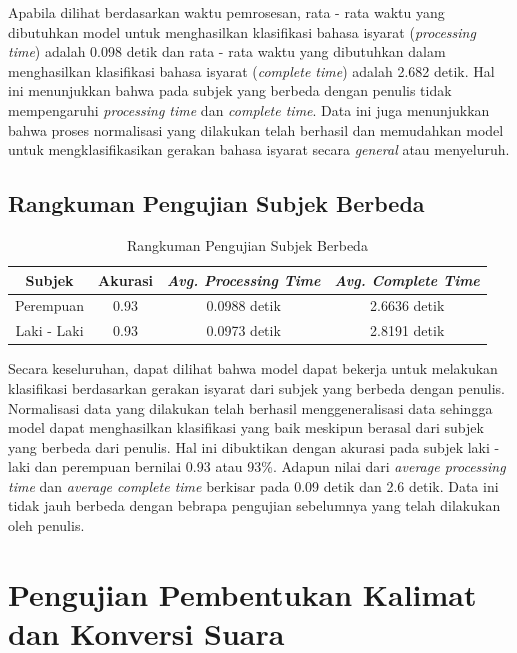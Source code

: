 Apabila dilihat berdasarkan waktu pemrosesan, rata - rata waktu yang dibutuhkan model untuk menghasilkan klasifikasi bahasa isyarat (\emph{processing time}) adalah 0.098 detik dan rata - rata waktu yang dibutuhkan dalam menghasilkan klasifikasi bahasa isyarat (\emph{complete time}) adalah 2.682 detik. Hal ini menunjukkan bahwa pada subjek yang berbeda dengan penulis tidak mempengaruhi \emph{processing time} dan \emph{complete time}. Data ini juga menunjukkan bahwa proses normalisasi yang dilakukan telah berhasil dan memudahkan model untuk mengklasifikasikan gerakan bahasa isyarat secara \emph{general} atau menyeluruh.  

\newpage
\subsection{Rangkuman Pengujian Subjek Berbeda}
\label{sec:analisissubjekberbeda}

\begin{longtable}{|c|c|c|c|}
  \caption{Rangkuman Pengujian Subjek Berbeda}
  \label{tb:evaluasiSubjek}                                   \\
  \hline
  \rowcolor[HTML]{C0C0C0}
  \textbf{Subjek} & \textbf{Akurasi} & \emph{\textbf{Avg. Processing Time}} & \emph{\textbf{Avg. Complete Time}} \\
  \hline
  Perempuan & 0.93   & 0.0988 detik & 2.6636 detik \\
  Laki - Laki & 0.93 & 0.0973 detik & 2.8191 detik \\
  \hline
\end{longtable}

Secara keseluruhan, dapat dilihat bahwa model dapat bekerja untuk melakukan klasifikasi berdasarkan gerakan isyarat dari subjek yang berbeda dengan penulis. Normalisasi data yang dilakukan telah berhasil menggeneralisasi data sehingga model dapat menghasilkan klasifikasi yang baik meskipun berasal dari subjek yang berbeda dari penulis. Hal ini dibuktikan dengan akurasi pada subjek laki - laki dan perempuan bernilai 0.93 atau 93\%. Adapun nilai dari \emph{average processing time} dan \emph{average complete time} berkisar pada 0.09 detik dan 2.6 detik. Data ini tidak jauh berbeda dengan bebrapa pengujian sebelumnya yang telah dilakukan oleh penulis.

\section{Pengujian Pembentukan Kalimat dan Konversi Suara}
\label{sec:analisiskalimat}

